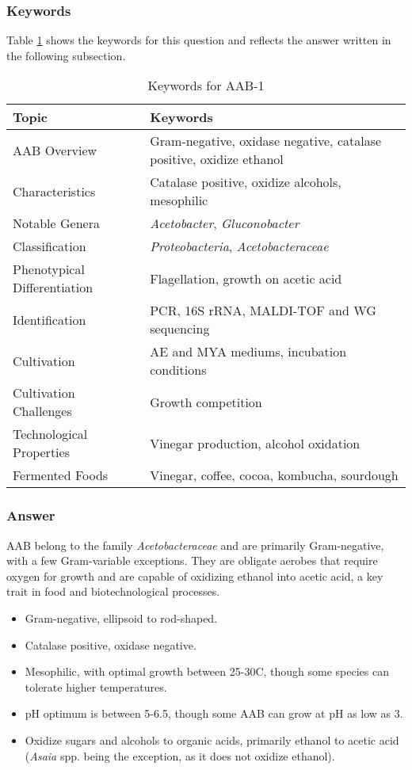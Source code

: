 \subsubsection*{Keywords}
Table \ref{tab:KW-AAB1} shows the keywords for this question and reflects the answer written in the following subsection.
\begin{table}[h]
    \centering
    \caption{Keywords for AAB-1} 
    \label{tab:KW-AAB1}
    \begin{tabular}{l|l}
        \textbf{Topic} & \textbf{Keywords} \\
        \hline
        AAB Overview & Gram-negative, oxidase negative, catalase positive, oxidize ethanol \\
        Characteristics & Catalase positive, oxidize alcohols, mesophilic \\
        Notable Genera & \textit{Acetobacter}, \textit{Gluconobacter} \\
        Classification & \textit{Proteobacteria}, \textit{Acetobacteraceae} \\
        Phenotypical Differentiation & Flagellation, growth on acetic acid \\
        Identification & PCR, 16S rRNA, MALDI-TOF and WG sequencing\\
        Cultivation & AE and MYA mediums, incubation conditions \\
        Cultivation Challenges & Growth competition \\
        Technological Properties & Vinegar production, alcohol oxidation \\
        Fermented Foods & Vinegar, coffee, cocoa, kombucha, sourdough \\
    \end{tabular}
\end{table}

\subsubsection*{Answer}
AAB belong to the family \textit{Acetobacteraceae} and are primarily Gram-negative, with a few Gram-variable exceptions. They are obligate aerobes that require oxygen for growth and are capable of oxidizing ethanol into acetic acid, a key trait in food and biotechnological processes.

\begin{itemize}
    \item Gram-negative, ellipsoid to rod-shaped.
    \item Catalase positive, oxidase negative.
    \item Mesophilic, with optimal growth between 25-30\textdegree C, though some species can tolerate higher temperatures.
    \item pH optimum is between 5-6.5, though some AAB can grow at pH as low as 3.
    \item Oxidize sugars and alcohols to organic acids, primarily ethanol to acetic acid (\textit{Asaia} spp. being the exception, as it does not oxidize ethanol).
\end{itemize}


